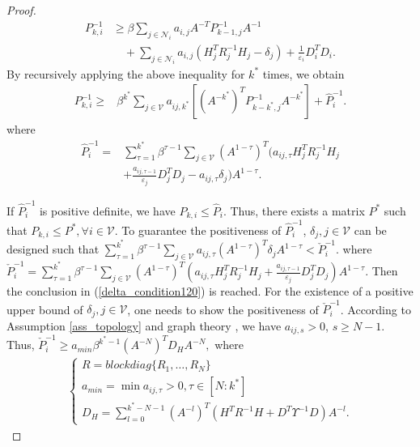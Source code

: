 \documentclass[journal,transmag]{IEEEtran}
\begin{document}
{\begin{proof}
		\begin{align}\label{P_recursive}
		P_{k,i}^{-1}
		&\geq\beta\sum_{j\in \mathcal{N}_{i}}a_{i,j}A^{-T}P_{k-1,j}^{-1}A^{-1}\\
		&\quad+\sum_{j\in \mathcal{N}_{i}}a_{i,j}(H_{j}^TR_{j}^{-1}H_{j}-\delta_{j})+\frac{1}{\varepsilon_i }D_{i}^TD_{i}.\nonumber
		\end{align}	
		By recursively applying the above inequality for $k^{*}$ times, we obtain
		\begin{equation*}\label{P_recursive2}
		\begin{split}
		P_{k,i}^{-1}\geq&\beta^{k^{*}}\sum_{j\in \mathcal{V}}a_{ij,k^{*}}\left[ (A^{-k^{*}})^{T}P_{k-k^{*},j}^{-1}A^{-k^{*}}\right] +\hat P_{i}^{-1}.
		\end{split}
		\end{equation*}	
		where
		\begin{align}
		\hat P_{i}^{-1}=&\sum_{\tau=1}^{k^{*}}\beta^{\tau-1}\sum_{j\in \mathcal{V}}(A^{1-\tau})^{T}\big(a_{ij,\tau}H_{j}^TR_{j}^{-1}H_{j}\nonumber\\
		&+\frac{a_{ij,\tau-1}}{\varepsilon_j }D_{j}^TD_{j}-a_{ij,\tau}\delta_{j}\big)A^{1-\tau}.\label{P_upper}
		\end{align}
		
	

If $\hat P_i^{-1}$ is positive definite, we have $P_{k,i}\leq \hat P_i$. Thus, there exists a matrix $P^*$ such that $P_{k,i}\leq P^*, \forall i\in \mathcal{V}$.
		To guarantee the positiveness of $\hat P_i^{-1}$, $\delta_{j},j\in \mathcal{V}$ can be designed such that
		$\sum_{\tau=1}^{k^{*}}\beta^{\tau-1}\sum_{j\in \mathcal{V}}a_{ij,\tau}(A^{1-\tau})^{T}\delta_{j}A^{1-\tau}
		<\check{P}_{i}^{-1}.$		
		where $\check{P}_{i}^{-1}=\sum_{\tau=1}^{k^{*}}\beta^{\tau-1}\sum_{j\in \mathcal{V}}(A^{1-\tau})^{T}(a_{ij,\tau}H_{j}^TR_{j}^{-1}H_{j}+\frac{a_{ij,\tau-1}}{\varepsilon_j }D_{j}^TD_{j})A^{1-\tau}.$
		Then the conclusion in  (\ref{delta_condition120}) is reached.
		For the existence of a positive upper bound of $\delta_{j},j\in\mathcal{V}$,  one needs to show the positiveness of $\check{P}_{i}^{-1}$. 	
		According to  Assumption \ref{ass_topology} and graph theory \cite{horn2012matrix, varga2009matrix}, we have $a_{ij,s}>0$, $s\geq N-1$. Thus,
		$\check{P}_{i}^{-1}	\geq a_{min}\beta^{k^{*}-1}(A^{-N})^{T}D_{H}A^{-N},$
		where
		\begin{align*}
		\begin{cases}
		R= blockdiag\{R_{1},\ldots,R_{N}\}\\
		a_{min}=\min{a_{ij,\tau}>0,\tau\in [N:k^{*}]}\\
		D_{H}=\sum_{l=0}^{k^{*}-N-1}(A^{-l})^{T}(H^TR^{-1}H+D^T\Upsilon^{-1}D)A^{-l}.
		\end{cases}		
		\end{align*}


\end{proof}}
\end{document}
